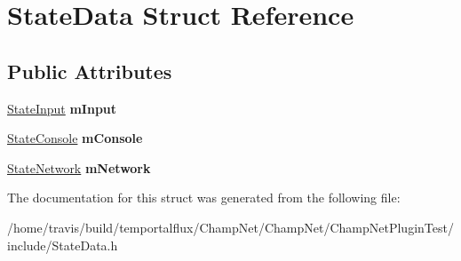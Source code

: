\hypertarget{struct_state_data}{\section{State\-Data Struct Reference}
\label{struct_state_data}
}
\subsection*{Public Attributes}
\begin{DoxyCompactItemize}
\item 
\hypertarget{struct_state_data_a0535bc84710174d9fc4051979e2d631b}{\hyperlink{struct_state_input}{State\-Input} {\bfseries m\-Input}}\label{struct_state_data_a0535bc84710174d9fc4051979e2d631b}

\item 
\hypertarget{struct_state_data_a55d003000ef9ac2290f9aff3c2e4437d}{\hyperlink{struct_state_console}{State\-Console} {\bfseries m\-Console}}\label{struct_state_data_a55d003000ef9ac2290f9aff3c2e4437d}

\item 
\hypertarget{struct_state_data_a0490590a43df414f8d751f50afbe926f}{\hyperlink{struct_state_network}{State\-Network} {\bfseries m\-Network}}\label{struct_state_data_a0490590a43df414f8d751f50afbe926f}

\end{DoxyCompactItemize}


The documentation for this struct was generated from the following file\-:\begin{DoxyCompactItemize}
\item 
/home/travis/build/temportalflux/\-Champ\-Net/\-Champ\-Net/\-Champ\-Net\-Plugin\-Test/include/State\-Data.\-h\end{DoxyCompactItemize}
